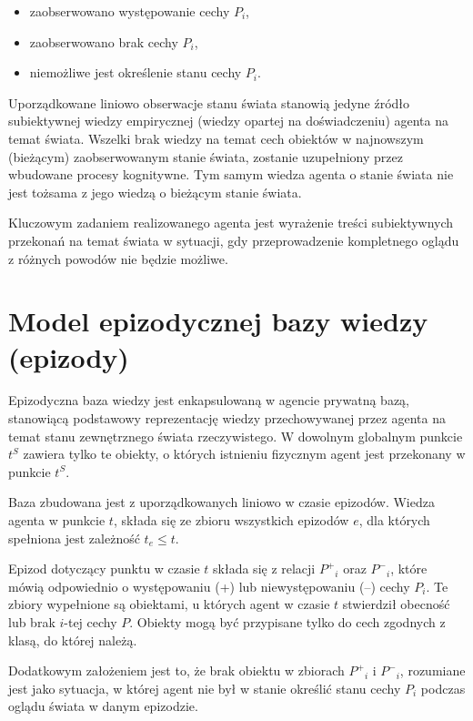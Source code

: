 	\begin{itemize}
	 	\setlength{\itemindent}{.5in}
		\item zaobserwowano występowanie cechy $ P_i $,
		\item zaobserwowano brak cechy $ P_i $,
		\item niemożliwe jest określenie stanu cechy $ P_i $.
	\end{itemize}
	
	Uporządkowane liniowo obserwacje stanu świata stanowią jedyne źródło subiektywnej wiedzy empirycznej (wiedzy opartej na doświadczeniu) agenta na temat świata. Wszelki brak wiedzy na temat cech obiektów w najnowszym (bieżącym) zaobserwowanym stanie świata, zostanie uzupełniony przez wbudowane procesy kognitywne. Tym samym wiedza agenta o stanie świata nie jest tożsama z jego wiedzą o bieżącym stanie świata.
	
	Kluczowym zadaniem realizowanego agenta jest wyrażenie treści subiektywnych przekonań na temat świata w sytuacji, gdy przeprowadzenie kompletnego oglądu z różnych powodów nie będzie możliwe.
	

\section{Model epizodycznej bazy wiedzy (epizody)}

Epizodyczna baza wiedzy jest enkapsulowaną w agencie prywatną bazą, stanowiącą podstawowy reprezentację wiedzy przechowywanej przez agenta na temat stanu zewnętrznego świata rzeczywistego. W dowolnym globalnym punkcie $ t^S $ zawiera tylko te obiekty, o których istnieniu fizycznym agent jest przekonany w punkcie $ t^S $.

Baza zbudowana jest z uporządkowanych liniowo w czasie epizodów. Wiedza agenta w punkcie $ t $, składa się ze zbioru wszystkich epizodów $ e $, dla których spełniona jest zależność $ t_e \le t $. 

Epizod dotyczący punktu w czasie $ t $ składa się z relacji 
$ P^+{}_i $ oraz $ P^-{}_i $, 
które mówią odpowiednio o występowaniu (+) lub niewystępowaniu (--) cechy $ P_i $. Te zbiory wypełnione są obiektami, u których agent w czasie $ t $ stwierdził obecność lub brak $ i $-tej cechy $ P $. Obiekty mogą być przypisane tylko do cech zgodnych z klasą, do której należą. 

Dodatkowym założeniem jest to, że brak obiektu w zbiorach 
$ P^+{}_i $ i $ P^-{}_i $, 
rozumiane jest jako sytuacja, w której agent nie był w stanie określić stanu cechy $ P_i $ podczas oglądu świata w danym epizodzie.


